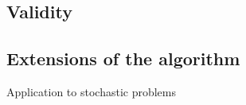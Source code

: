 \documentclass[10pt,a4paper]{article}
\theoremstyle{definition}
\theoremstyle{remark}
\begin{document}
\subsection{Validity}\label{sec. validityAlgo}
%
%
%
%

\subsection{Extensions of the algorithm}\label{sec. extensions}

Application to stochastic problems
\end{document}

